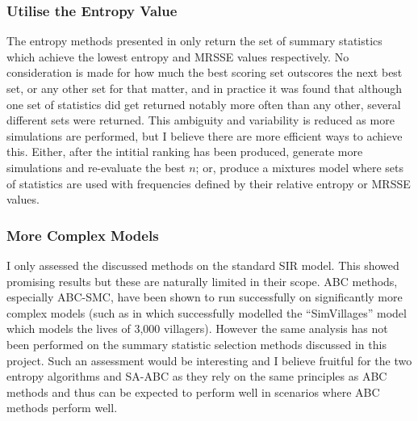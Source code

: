\documentclass[11pt,a4paper]{article}
\theoremstyle{break}
\begin{document}
\subsubsection*{Utilise the Entropy Value}

  \par The entropy methods presented in \cite[]{on_optimal_selection_of_summary_stats_for_ABC} only return the set of summary statistics which achieve the lowest entropy and MRSSE values respectively. No consideration is made for how much the best scoring set outscores the next best set, or any other set for that matter, and in practice it was found that although one set of statistics did get returned notably more often than any other, several different sets were returned. This ambiguity and variability is reduced as more simulations are performed, but I believe there are more efficient ways to achieve this. Either, after the intitial ranking has been produced, generate more simulations and re-evaluate the best $n$; or, produce a mixtures model where sets of statistics are used with frequencies defined by their relative entropy or MRSSE values.

\subsubsection*{More Complex Models}

  \par I only assessed the discussed methods on the standard SIR model. This showed promising results but these are naturally limited in their scope. ABC methods, especially ABC-SMC, have been shown to run successfully on significantly more complex models (such as in \cite[]{adaptive_abc_for_complex_models} which successfully modelled the ``SimVillages'' model \cite[]{common_framework_for_the_microsimulation_model} which models the lives of 3,000 villagers). However the same analysis has not been performed on the summary statistic selection methods discussed in this project. Such an assessment would be interesting and I believe fruitful for the two entropy algorithms and SA-ABC as they rely on the same principles as ABC methods and thus can be expected to perform well in scenarios where ABC methods perform well.

\newpage
\setcounter{page}{1}


\end{document}
